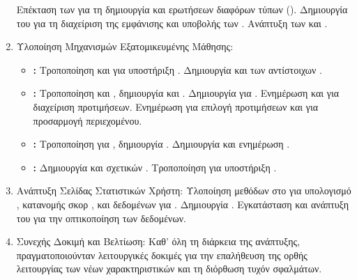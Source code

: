 \begin{enumerate}[leftmargin=*, noitemsep]
    Επέκταση των  για τη δημιουργία  και ερωτήσεων διαφόρων τύπων ().
    Δημιουργία του  για τη διαχείριση της εμφάνισης και υποβολής των .
    Ανάπτυξη των  και .
    \item Υλοποίηση Μηχανισμών Εξατομικευμένης Μάθησης:
    \begin{itemize}[leftmargin=*, noitemsep]
        \item \textbf{:}
        Τροποποίηση  και  για υποστήριξη .
        Δημιουργία  και των αντίστοιχων .
        \item \textbf{:}
        Τροποποίηση  και , δημιουργία  και .
        Δημιουργία  για .
        Ενημέρωση  και  για διαχείριση προτιμήσεων.
        Ενημέρωση  για επιλογή προτιμήσεων και  για προσαρμογή περιεχομένου.
        \item \textbf{:}
        Τροποποίηση  για , δημιουργία .
        Δημιουργία  και ενημέρωση .
        \item \textbf{:}
        Δημιουργία  και σχετικών .
        Τροποποίηση  για υποστήριξη .
    \end{itemize}
    \item Ανάπτυξη Σελίδας Στατιστικών Χρήστη:
    Υλοποίηση μεθόδων στο  για υπολογισμό , κατανομής σκορ , και δεδομένων για .
    Δημιουργία .
    Εγκατάσταση  και ανάπτυξη του  για την οπτικοποίηση των δεδομένων.
    \item Συνεχής Δοκιμή και Βελτίωση:
    Καθ' όλη τη διάρκεια της ανάπτυξης, πραγματοποιούνταν λειτουργικές δοκιμές για την επαλήθευση της ορθής λειτουργίας των νέων χαρακτηριστικών και τη διόρθωση τυχόν σφαλμάτων.
\end{enumerate}